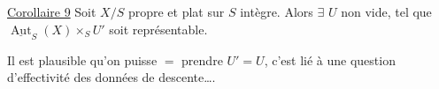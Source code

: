 \uline{Corollaire 9} Soit $X/S$ propre et plat sur $S$  intègre. Alors $\exists$ $U$ non vide,  tel que $\underline{\operatorname{Aut}}_S(X)\times_S U'$ soit représentable.

Il est plausible qu'on puisse $=$ prendre $U'=U$, c'est lié à une question d'effectivité des données de descente\ldots.



